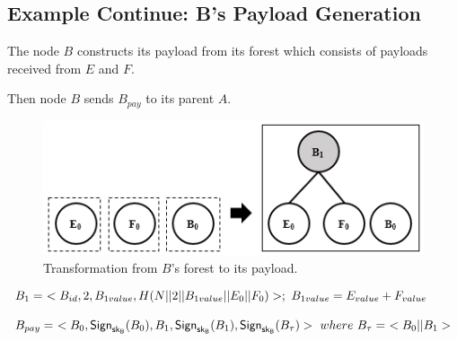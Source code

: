 \documentclass[%
  slidesonly,%
  semlayer%
  ]{seminar}                                  %
\newcommand{\sk}{\sf{sk}}
\begin{document}
\begin{slide}
    \subsection*{Example Continue: B's Payload Generation}  
      The node $B$ constructs its payload from its forest which consists of payloads received from $E$ and $F$.

      Then node $B$ sends $B_{pay}$ to its parent $A$.
      \begin{figure}[h!]
        \centering
        \includegraphics[scale = 0.5]{images/b-forest-payload.png}
        \caption{Transformation from $B$'s forest to its payload.}
        \label{fig:b-forest-payload}
      \end{figure}
      
      
      \begin{equation*}
        \begin{array}{l}
          B_{1} =\ < B_{id}, 2, B_{1value}, H(N||2||B_{1value}||E_{0}||F_{0})>;\ B_{1value} = E_{value} + F_{value}\\
          \\
          B_{pay} =\ < B_{0}, \textsf{Sign}_{\sk_{B}}(B_{0}), B_{1}, \textsf{Sign}_{\sk_{B}}(B_{1}), \textsf{Sign}_{\sk_{B}}(B_{\tau}) >\ where\ B_{\tau} =\ <B_{0} || B_{1}>\\
        \end{array}
        \label{eq:b-payload}
      \end{equation*}


      \vfill
      \clearpage
    

\end{slide}
\end{document}
